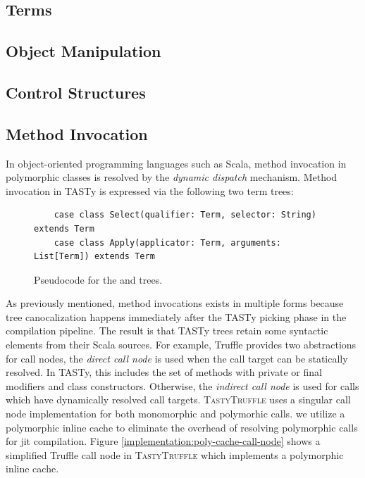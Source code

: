 \subsection*{Terms}

\subsection*{Object Manipulation}

\subsection*{Control Structures}


\subsection*{Method Invocation}

In object-oriented programming languages such as Scala, method invocation in polymorphic classes is resolved by the \textit{dynamic dispatch} mechanism. 
Method invocation in TASTy is expressed via the following two term trees:

\begin{figure}[H]
	\begin{verbatim}
	case class Select(qualifier: Term, selector: String) extends Term 
	case class Apply(applicator: Term, arguments: List[Term]) extends Term
	\end{verbatim}
	\caption{Pseudocode for the  and  trees.}
\end{figure}

As previously mentioned, method invocations exists in multiple forms because tree canocalization happens immediately after the TASTy picking phase in the compilation pipeline.
The result is that TASTy trees retain some syntactic elements from their Scala sources. 
For example, Truffle provides two abstractions for call nodes, the \textit{direct call node} is used when the call target can be statically resolved. 
In TASTy, this includes the set of methods with private or final modifiers\cite{java:lang-spec} and class constructors. 
Otherwise, the \textit{indirect call node} is used for calls which have dynamically resolved call targets. 
\textsc{TastyTruffle} uses a singular call node implementation for both monomorphic and polymorhic calls. 
we utilize a polymorphic inline cache\cite{self:polymorphic-inline-caches} to eliminate the overhead of resolving polymorphic calls for \acrshort{jit} compilation. 
Figure \ref{implementation:poly-cache-call-node} shows a simplified Truffle call node in \textsc{TastyTruffle} which implements a polymorphic inline cache.

